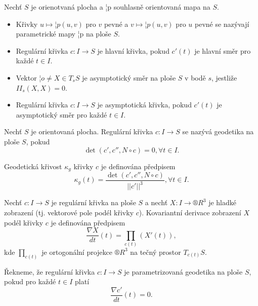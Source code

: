 \documentclass[12pt]{article}                   %
\begin{document}
        \begin{definice}
            Nechť $S$ je orienotvaná plocha a ¦p souhlasně orientovaná mapa na $S$.

            \begin{itemize}
                \item Křivky $u \mapsto ¦p(u, v)$ pro $v$ pevné a $v \mapsto ¦p(u, v)$ pro $u$ pevné se nazývají parametrické mapy ¦p na ploše $S$.
                \item Regulární křivka $c: I \rightarrow S$ je hlavní křivka, pokud $c'(t)$ je hlavní směr pro každé $t \in I$.
                \item Vektor $¦o ≠ X \in T_sS$ je asymptotický směr na ploše $S$ v bodě $s$, jestliže $II_s(X, X) = 0$.
                \item Regulární křivka $c: I \rightarrow S$ je asymptotická křivka, pokud $c'(t)$ je asymptotický směr pro každé $t \in I$.
            \end{itemize}
        \end{definice}

        \begin{definice}
            Nechť $S$ je orientovaná plocha. Regulární křivka $c: I \rightarrow S$ se nazývá geodetika na ploše $S$, pokud
            $$ \det(c', c'', N \circ c) = 0, \forall t \in I. $$

            Geodetická křivost $\kappa_g$ křivky $c$ je definována předpisem
            $$ \kappa_g(t) = \frac{\det(c', c'', N \circ c)}{||c'||^3}, \forall t \in I. $$ 
        \end{definice}

        \begin{definice}
            Nechť $c: I \rightarrow S$ je regulární křivka na ploše $S$ a nechť $X: I \rightarrow ®R^3$ je hladké zobrazení (tj. vektorové pole podél křivky $c$). Kovariantní derivace zobrazení $X$ podél křivky $c$ je definována předpisem
            $$ \frac{\nabla X}{dt}(t) = \prod_{c(t)}(X'(t)), $$
            kde $\prod_{c(t)}$ je ortogonální projekce $®R^3$ na tečný prostor $T_{c(t)}S$.
        \end{definice}

        \begin{definice}
            Řekneme, že regulární křivka $c: I \rightarrow S$ je parametrizovaná geodetika na ploše $S$, pokud pro každé $t \in I$ platí
            $$ \frac{\nabla c'}{dt}(t) = 0. $$ 
        \end{definice}
\end{document}

